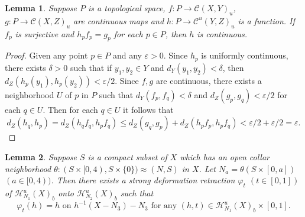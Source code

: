 \documentclass[11pt, fleqn]{amsart}
\newtheorem{lemma}{Lemma}[section]
\theoremstyle{definition}
\newcommand{\cal}{\mathcal}
\renewcommand{\phi}{\varphi}
\newcommand{\e}{\varepsilon}
\begin{document}

\begin{lemma}\label{lemma_conti} Suppose $P$ is a topological space, 
$f : P \to {\cal C}(X, Y)_u$, $g : P \to {\cal C}(X, Z)_u$ are continuous maps 
and $h : P \to {\cal C}^u(Y, Z)_u$ is a function. 
If $f_p$ is surjective and $h_pf_p = g_p$ for each $p \in P$, then $h$ is continuous. 
\end{lemma}

\begin{proof} Given any point $p \in P$ and any $\e > 0$. 
Since $h_p$ is uniformly continuous, there exists $\delta > 0$ such that 
if $y_1, y_2 \in Y$ and $d_Y(y_1, y_2) < \delta$, then $d_Z(h_p(y_1), h_p(y_2)) < \e/2$.  
Since $f, g$ are continuous, there exists a neighborhood $U$ of $p$ in $P$ such that 
$d_Y(f_p, f_q) < \delta$ and $d_Z(g_p, g_q) < \e/2$ for each $q \in U$. 
Then for each $q \in U$ it follows that 
$$d_Z(h_q, h_p) = d_Z(h_qf_q, h_pf_q) \leq d_Z(g_q, g_p) + d_Z(h_pf_p, h_pf_q) < \e/2 + \e/2 = \e.$$ 
\vskip -7mm 
\end{proof}

\begin{lemma}\label{lemma_collar} 
Suppose $S$ is a compact subset of $X$ which has an open collar neighborhood $\theta : (S \times [0, 4), S \times \{ 0 \}) \approx (N, S)$ in $X$. Let $N_a = \theta(S \times [0,a])$ $(a \in [0,4))$. Then there exists a strong deformation retraction 
$\phi_t$ $(t \in [0,1])$ of ${\cal H}^u_{N_1}(X)_b$ onto ${\cal H}^u_{N_2}(X)_b$ such that 
$$\mbox{$\phi_t(h) = h$ \ on \ $h^{-1}(X - N_3) - N_3$ \ \ for any \ $(h,t ) \in {\cal H}^u_{N_1}(X)_b \times [0,1]$.}$$  
\end{lemma}
\end{document}
